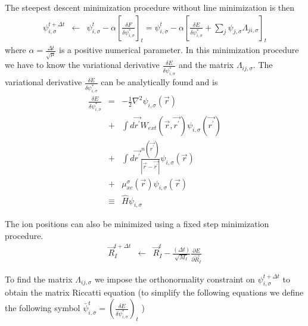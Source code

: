 \noindent
The steepest descent minimization procedure without line minimization
is then
\begin{eqnarray}
\psi_{i,\sigma}^{t+ \Delta t} 
                   &\leftarrow& 
                    \psi_{i,\sigma}^{t} 
                      - \alpha 
                        \left[ 
                           \frac{\delta F}{\delta \psi_{i,\sigma}^{*}}
                        \right]_{t}
                   = \psi_{i,\sigma}^{t} 
                      - \alpha 
                        \left[ 
                           \frac{\delta E}{\delta \psi_{i,\sigma}^{*}}
                            + \sum_{j} \psi_{j,\sigma} \Lambda_{ji,\sigma} 
                        \right]_{t}
\label{eq:sd2}
\end{eqnarray}
where $\alpha =\frac{\Delta t}{\sqrt{\mu}}$ is a positive numerical parameter.
In this minimization procedure we have to know the variational derivative
$\frac{\delta E}{\delta \psi_{i,\sigma}^{*}}$ and the matrix 
$\Lambda_{ij,\sigma}$. 
The variational derivative $\frac{\delta E}{\delta \psi_{i,\sigma}^{*}}$ 
can be analytically found and is
\begin{eqnarray}
\frac{\delta E}{\delta \psi_{i,\sigma}^{*}} 
      &=&  -\frac{1}{2} \nabla^2 
            \psi_{i,\sigma}(\vec{r}) \nonumber \\
      &+& \int d\vec{r^{\prime}} 
           W_{ext}(\vec{r},\vec{r^{\prime}}) 
          \psi_{i,\sigma}(\vec{r^{\prime}}) \nonumber \\
      &+& \int d\vec{r^{\prime}} 
                    \frac{n(\vec{r^{\prime}})}{|\vec{r}-\vec{r^{\prime}}|}
          \psi_{i,\sigma}(\vec{r}) \nonumber \\
      &+& \mu_{xc}^{\sigma}(\vec{r}) 
          \psi_{i,\sigma}(\vec{r}) \nonumber \\
& \equiv & \hat{H} \psi_{i,\sigma}
\label{eq:sd3}
\end{eqnarray}
  
The ion positions can also be minimized using a fixed step minimization 
procedure.
\begin{eqnarray}
\vec{R}_I^{t+\Delta t} &\leftarrow& 
                      \vec{R}_I^{t}
                    - \frac{(\Delta t)}{\sqrt{M_I}} 
                       \frac{\partial E}{\partial \vec{R}_I}
\end{eqnarray}
                      
\noindent
To find the matrix $\Lambda_{ij,\sigma}$ we impose the orthonormality
constraint on $\psi_{i,\sigma}^{t+\Delta t}$ to obtain the
matrix Riccatti equation 
(to simplify the following equations we define the following symbol
$\bar{\psi}_{i,\sigma}^{t} =  
              \left(\frac{\delta E}{\delta \psi_{i,\sigma}^{*}} \right)_{t}$
)

